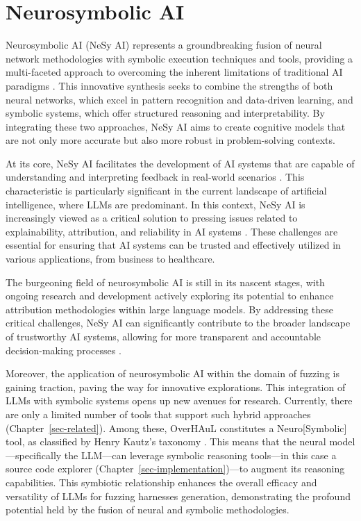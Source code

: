 \documentclass[
  a4paper,
  DIV=11,
  numbers=noendperiod]{scrreprt}
\theoremstyle{definition}
\theoremstyle{remark}
\begin{document}
\section{Neurosymbolic AI}\label{sec-nesy}

Neurosymbolic AI (NeSy AI) represents a groundbreaking fusion of neural
network methodologies with symbolic execution techniques and tools,
providing a multi-faceted approach to overcoming the inherent
limitations of traditional AI paradigms \autocite{sheth2023,garcez2020}.
This innovative synthesis seeks to combine the strengths of both neural
networks, which excel in pattern recognition and data-driven learning,
and symbolic systems, which offer structured reasoning and
interpretability. By integrating these two approaches, NeSy AI aims to
create cognitive models that are not only more accurate but also more
robust in problem-solving contexts.

At its core, NeSy AI facilitates the development of AI systems that are
capable of understanding and interpreting feedback in real-world
scenarios \autocite{ganguly2024}. This characteristic is particularly
significant in the current landscape of artificial intelligence, where
LLMs are predominant. In this context, NeSy AI is increasingly viewed as
a critical solution to pressing issues related to explainability,
attribution, and reliability in AI systems
\autocite{gaur2023,tilwani2024}. These challenges are essential for
ensuring that AI systems can be trusted and effectively utilized in
various applications, from business to healthcare.

The burgeoning field of neurosymbolic AI is still in its nascent stages,
with ongoing research and development actively exploring its potential
to enhance attribution methodologies within large language models. By
addressing these critical challenges, NeSy AI can significantly
contribute to the broader landscape of trustworthy AI systems, allowing
for more transparent and accountable decision-making processes
\autocite{sheth2023,gaur2023,tilwani2024}.

Moreover, the application of neurosymbolic AI within the domain of
fuzzing is gaining traction, paving the way for innovative explorations.
This integration of LLMs with symbolic systems opens up new avenues for
research. Currently, there are only a limited number of tools that
support such hybrid approaches (Chapter~\ref{sec-related}). Among these,
OverHAuL constitutes a Neuro{[}Symbolic{]} tool, as classified by Henry
Kautz's taxonomy \autocite{sarker2022,kautz2020}. This means that the
neural model---specifically the LLM---can leverage symbolic reasoning
tools---in this case a source code explorer
(Chapter~\ref{sec-implementation})---to augment its reasoning
capabilities. This symbiotic relationship enhances the overall efficacy
and versatility of LLMs for fuzzing harnesses generation, demonstrating
the profound potential held by the fusion of neural and symbolic
methodologies.
\end{document}
